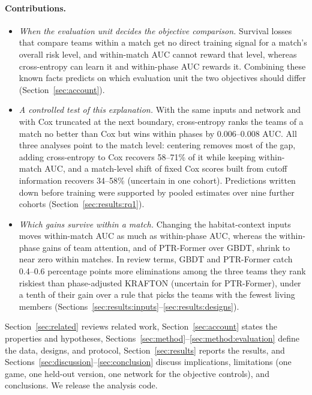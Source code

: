 \documentclass[sigconf,anonymous,nonacm]{acmart}
\begin{document}
\paragraph{Contributions.}
\begin{itemize}
\item \emph{When the evaluation unit decides the objective comparison.} Survival losses that compare teams within a match get no direct training signal for a match's overall risk level, and within-match AUC cannot reward that level, whereas cross-entropy can learn it and within-phase AUC rewards it. Combining these known facts predicts on which evaluation unit the two objectives should differ (Section~\ref{sec:account}).
\item \emph{A controlled test of this explanation.} With the same inputs and network and with Cox truncated at the next boundary, cross-entropy ranks the teams of a match no better than Cox but wins within phases by 0.006--0.008 AUC. All three analyses point to the match level: centering removes most of the gap, adding cross-entropy to Cox recovers 58--71\% of it while keeping within-match AUC, and a match-level shift of fixed Cox scores built from cutoff information recovers 34--58\% (uncertain in one cohort). Predictions written down before training were supported by pooled estimates over nine further cohorts (Section~\ref{sec:results:rq1}).
\item \emph{Which gains survive within a match.} Changing the habitat-context inputs moves within-match AUC as much as within-phase AUC, whereas the within-phase gains of team attention, and of PTR-Former over GBDT, shrink to near zero within matches. In review terms, GBDT and PTR-Former catch 0.4--0.6 percentage points more eliminations among the three teams they rank riskiest than phase-adjusted KRAFTON (uncertain for PTR-Former), under a tenth of their gain over a rule that picks the teams with the fewest living members (Sections~\ref{sec:results:inputs}--\ref{sec:results:designs}).
\end{itemize}
Section~\ref{sec:related} reviews related work, Section~\ref{sec:account} states the properties and hypotheses, Sections~\ref{sec:method}--\ref{sec:method:evaluation} define the data, designs, and protocol, Section~\ref{sec:results} reports the results, and Sections~\ref{sec:discussion}--\ref{sec:conclusion} discuss implications, limitations (one game, one held-out version, one network for the objective controls), and conclusions. We release the analysis code.

\end{document}

